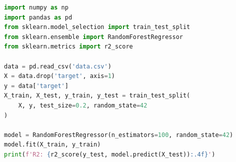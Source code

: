 
\begin{lstlisting}[language=Python]
import numpy as np
import pandas as pd
from sklearn.model_selection import train_test_split
from sklearn.ensemble import RandomForestRegressor
from sklearn.metrics import r2_score

data = pd.read_csv('data.csv')
X = data.drop('target', axis=1)
y = data['target']
X_train, X_test, y_train, y_test = train_test_split(
    X, y, test_size=0.2, random_state=42
)

model = RandomForestRegressor(n_estimators=100, random_state=42)
model.fit(X_train, y_train)
print(f'R2: {r2_score(y_test, model.predict(X_test)):.4f}')
\end{lstlisting}
